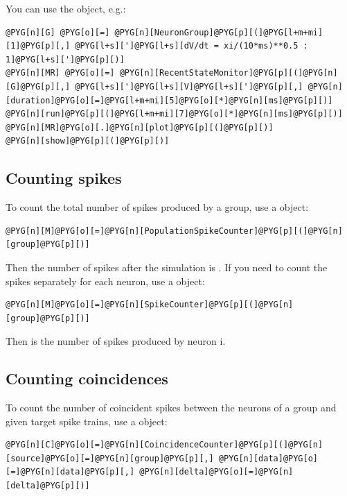 \documentclass[letterpaper,10pt,english]{manual}
\begin{document}
You can use the \hyperlink{brian.RecentStateMonitor}{} object, e.g.:

\begin{Verbatim}[commandchars=@\[\]]
@PYG[n][G] @PYG[o][=] @PYG[n][NeuronGroup]@PYG[p][(]@PYG[l+m+mi][1]@PYG[p][,] @PYG[l+s][']@PYG[l+s][dV/dt = xi/(10*ms)**0.5 : 1]@PYG[l+s][']@PYG[p][)]
@PYG[n][MR] @PYG[o][=] @PYG[n][RecentStateMonitor]@PYG[p][(]@PYG[n][G]@PYG[p][,] @PYG[l+s][']@PYG[l+s][V]@PYG[l+s][']@PYG[p][,] @PYG[n][duration]@PYG[o][=]@PYG[l+m+mi][5]@PYG[o][*]@PYG[n][ms]@PYG[p][)]
@PYG[n][run]@PYG[p][(]@PYG[l+m+mi][7]@PYG[o][*]@PYG[n][ms]@PYG[p][)]
@PYG[n][MR]@PYG[o][.]@PYG[n][plot]@PYG[p][(]@PYG[p][)]
@PYG[n][show]@PYG[p][(]@PYG[p][)]
\end{Verbatim}


\subsection{Counting spikes}

To count the total number of spikes produced by a group, use a \hyperlink{brian.PopulationSpikeCounter}{} object:

\begin{Verbatim}[commandchars=@\[\]]
@PYG[n][M]@PYG[o][=]@PYG[n][PopulationSpikeCounter]@PYG[p][(]@PYG[n][group]@PYG[p][)]
\end{Verbatim}

Then the number of spikes after the simulation is . If you need to count the spikes
separately for each neuron, use a \hyperlink{brian.SpikeCounter}{} object:

\begin{Verbatim}[commandchars=@\[\]]
@PYG[n][M]@PYG[o][=]@PYG[n][SpikeCounter]@PYG[p][(]@PYG[n][group]@PYG[p][)]
\end{Verbatim}

Then  is the number of spikes produced by neuron i.


\subsection{Counting coincidences}

To count the number of coincident spikes between the neurons of a group
and given target spike trains, use a \hyperlink{brian.CoincidenceCounter}{} object:

\begin{Verbatim}[commandchars=@\[\]]
@PYG[n][C]@PYG[o][=]@PYG[n][CoincidenceCounter]@PYG[p][(]@PYG[n][source]@PYG[o][=]@PYG[n][group]@PYG[p][,] @PYG[n][data]@PYG[o][=]@PYG[n][data]@PYG[p][,] @PYG[n][delta]@PYG[o][=]@PYG[n][delta]@PYG[p][)]
\end{Verbatim}
\end{document}
